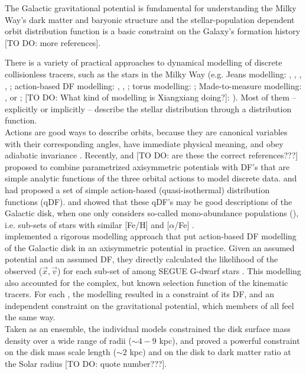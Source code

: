 The Galactic gravitational potential is fundamental for understanding the Milky Way's dark matter and baryonic structure \citep{rix13,2012EPJWC..1910002M,2013PhR...531....1S,2014JPhG...41f3101R} and the stellar-population dependent orbit distribution function is a basic constraint on the Galaxy's formation history \citep{2013NewAR..57...29B,rix13,san15} [TO DO: more references].

There is a variety of practical approaches to dynamical modelling of discrete collisionless tracers, such as the stars in the Milky Way (e.g. Jeans modelling: \citet{1989MNRAS.239..605K}, \citet{2012ApJ...756...89B}, \citet{2012MNRAS.425.1445G}, \citet{2013ApJ...772..108Z}, \citet{bue15}; action-based DF modelling: \citet{bov13}, \citet{pif14}, \citet{san15}; torus modelling:  \citet{2012MNRAS.419.2251M,2013MNRAS.433.1411M}; Made-to-measure modelling: \citet{sye96}, \citet{lor07} or \citet{hun14}; [TO DO: What kind of modelling is Xiangxiang doing?]: \citet{2015arXiv150606144X}). Most of them -- explicitly or implicitly -- describe the stellar distribution through a distribution function. \\

Actions are good ways to describe orbits, because they are canonical variables with their corresponding angles, have immediate physical meaning, and obey adiabatic invariance \citep{bin08,2008MNRAS.390..429M,bin10,bin11,bin11b}. Recently, \citet{2012MNRAS.426.1328B} and \citet{bov13} [TO DO: are these the correct references???] proposed to combine parametrized axisymmetric potentials with DF's that are simple analytic functions of the three orbital actions to model discrete data. \citet{bin10} and \citet{bin11} had proposed a set of simple action-based (quasi-isothermal) distribution functions (qDF). \citet{tin13} and \citet{bov13} showed that these qDF's may be good descriptions of the Galactic disk, when one only considers so-called mono-abundance populations (\MAP{}), i.e. sub-sets of stars with similar [Fe/H] and [$\alpha$/Fe] \citep{bov12b,bov12c,bov12d}. \\

\citet{bov13} implemented a rigorous modelling approach that put action-based DF modelling of the Galactic disk in an axisymmetric potential in practice. Given an assumed potential and an assumed DF, they directly calculated the likelihood of the observed ($\vec{x},\vec{v}$) for each sub-set of \MAP{} among SEGUE G-dwarf stars \citep{yan09}. This modelling also accounted for the complex, but known selection function of the kinematic tracers.  For each \MAP{}, the modelling resulted in a constraint of its DF, and an independent constraint on the gravitational potential, which members of all \MAPs{} feel the same way. \\
Taken as an ensemble, the individual \MAP{} models constrained the disk surface mass density over a wide range of radii ($\sim 4-9$ kpc), and proved a powerful constraint on the disk mass scale length ($\sim 2$ kpc) and on the disk to dark matter ratio at the Solar radius [TO DO: quote number???]. \\

